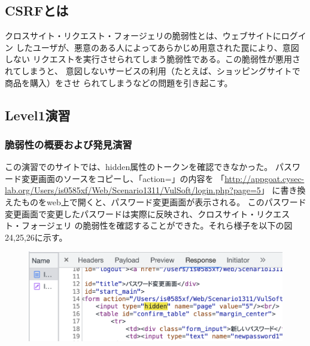 \documentclass[dvipdfmx,autodetect-engine,titlepage]{jsarticle}
\begin{document}
\subsection{CSRFとは}
クロスサイト・リクエスト・フォージェリの脆弱性とは、ウェブサイトにログイン
したユーザが、悪意のある人によってあらかじめ用意された罠により、意図しない
リクエストを実行させられてしまう脆弱性である。この脆弱性が悪用されてしまうと、
意図しないサービスの利用（たとえば、ショッピングサイトで商品を購入）をさせ
られてしまうなどの問題を引き起こす。

\subsection{Level1演習}

\subsubsection*{脆弱性の概要および発見演習}
この演習でのサイトでは、hidden属性のトークンを確認できなかった。
パスワード変更画面のソースをコピーし、「action=」の内容を
「\url{http://appgoat.cysec-lab.org/Users/is0585xf/Web/Scenario1311/VulSoft/login.php?page=5}」
に書き換えたものをweb上で開くと、パスワード変更画面が表示される。
このパスワード変更画面で変更したパスワードは実際に反映され、クロスサイト・リクエスト・フォージェリ
の脆弱性を確認することができた。それら様子を以下の図24,25,26に示す。

\begin{figure}[h]
  \centering
  \includegraphics[scale=0.4]{pic23_5.png}
  \caption{}
\end{figure}
\end{document}
